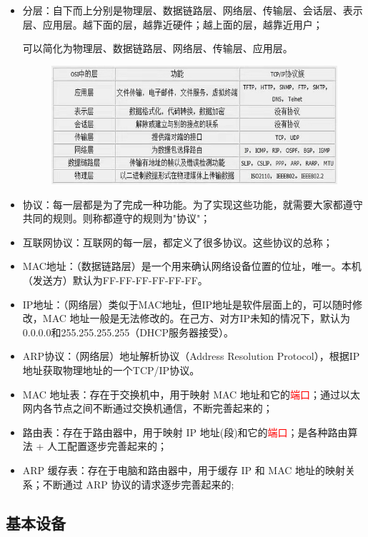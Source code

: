 \documentclass[UTF8]{article}%
\begin{document}
\begin{itemize}
    \item 分层：自下而上分别是物理层、数据链路层、网络层、传输层、会话层、表示层、应用层。越下面的层，越靠近硬件；越上面的层，越靠近用户；
    
    可以简化为物理层、数据链路层、网络层、传输层、应用层。

    \begin{figure}[htb!]%
        \includegraphics[width=1.0\textwidth]{1.1-2.jpg}
        \label{fig::2}
    \end{figure}

    \item 协议：每一层都是为了完成一种功能。为了实现这些功能，就需要大家都遵守共同的规则。则称都遵守的规则为"协议"；
    \item 互联网协议：互联网的每一层，都定义了很多协议。这些协议的总称；
    \item MAC地址：（数据链路层）是一个用来确认网络设备位置的位址，唯一。本机（发送方）默认为FF-FF-FF-FF-FF-FF。
    \item IP地址：（网络层）类似于MAC地址，但IP地址是软件层面上的，可以随时修改，MAC 地址一般是无法修改的。在己方、对方IP未知的情况下，默认为0.0.0.0和255.255.255.255（DHCP服务器接受）。
    \item ARP协议：（网络层）地址解析协议（Address Resolution Protocol），根据IP地址获取物理地址的一个TCP/IP协议。
    \item MAC 地址表：存在于交换机中，用于映射 MAC 地址和它的\textcolor{red}{端口}；通过以太网内各节点之间不断通过交换机通信，不断完善起来的；
    \item 路由表：存在于路由器中，用于映射 IP 地址(段)和它的\textcolor{red}{端口}；是各种路由算法 + 人工配置逐步完善起来的；
    \item ARP 缓存表：存在于电脑和路由器中，用于缓存 IP 和 MAC 地址的映射关系；不断通过 ARP 协议的请求逐步完善起来的;
\end{itemize}

\subsection{基本设备}
\end{document}
